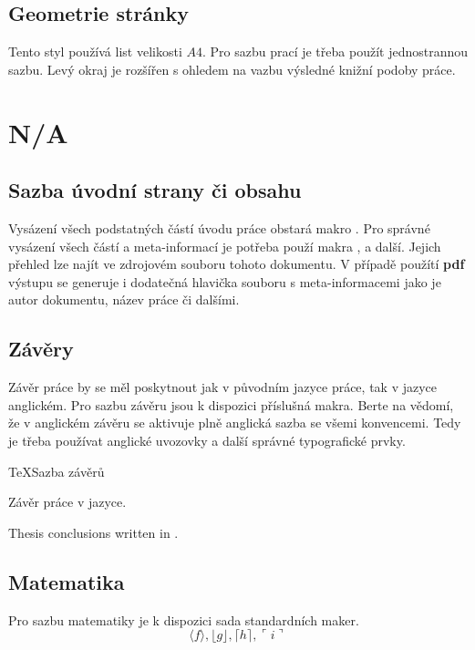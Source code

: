 \documentclass[
  program=itk,
  biblatex,
  language=czech,
  figures=false,
  glossaries,
  index
]{kidiplom}
\begin{document}
\subsection{Geometrie stránky}
Tento styl používá list velikosti $A4$. Pro sazbu prací je třeba použít jednostrannou sazbu. Levý okraj je rozšířen s ohledem na vazbu výsledné knižní podoby práce.

\section{N/A}
\subsection{Sazba úvodní strany či obsahu}
Vysázení všech podstatných částí úvodu práce obstará makro . Pro správné vysázení všech částí a meta-informací je potřeba použí makra , \mbox{} a další. Jejich přehled lze najít ve zdrojovém souboru tohoto dokumentu. V případě použítí \textbf{pdf} výstupu se generuje i dodatečná hlavička souboru s meta-informacemi jako je autor dokumentu, název práce či dalšími.

\subsection{Závěry}
Závěr práce by se měl poskytnout jak v původním jazyce práce, tak v jazyce anglickém. Pro sazbu závěru jsou k dispozici příslušná makra. Berte na vědomí, že v anglickém závěru se aktivuje plně anglická sazba se všemi konvencemi. Tedy je třeba používat anglické uvozovky a další správné typografické prvky.

\begin{kicode}{TeX}{}{Sazba závěrů}
\begin{kiconclusions}
Závěr práce v  jazyce.
\end{kiconclusions}

\begin{kiconclusions}[english]
Thesis conclusions written in .
\end{kiconclusions}
\end{kicode}

\subsection{Matematika}
Pro sazbu matematiky je k dispozici sada standardních maker.
$$\langle f \rangle, \lfloor g \rfloor,
\lceil h \rceil, \ulcorner i \urcorner$$
\end{document}
